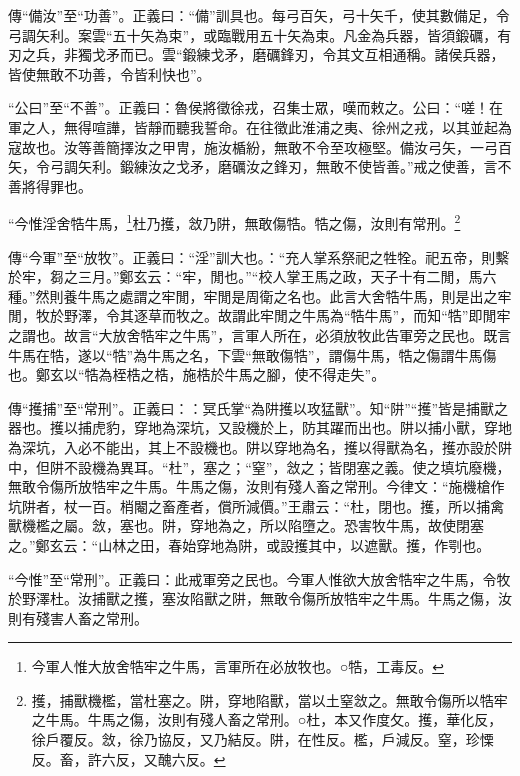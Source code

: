 {\noindent\zhuan{}\fzbyks 傳“備汝”至“功善”。正義曰：“備”訓具也。每弓百矢，弓十矢千，使其數備足，令弓調矢利。案雲“五十矢為束”，或臨戰用五十矢為束。凡金為兵器，皆須鍛礪，有刃之兵，非獨戈矛而已。雲“鍛練戈矛，磨礪鋒刃，令其文互相通稱。諸侯兵器，皆使無敢不功善，令皆利快也”。 \par}

{\noindent\shu{}\fzkt “公曰”至“不善”。正義曰：魯侯將徵徐戎，召集士眾，嘆而敕之。公曰：“嗟！在軍之人，無得喧譁，皆靜而聽我誓命。在往徵此淮浦之夷、徐州之戎，以其並起為寇故也。汝等善簡擇汝之甲冑，施汝楯紛，無敢不令至攻極堅。備汝弓矢，一弓百矢，令弓調矢利。鍛練汝之戈矛，磨礪汝之鋒刃，無敢不使皆善。”戒之使善，言不善將得罪也。 \par}

“今惟淫舍牿牛馬，\footnote{今軍人惟大放舍牿牢之牛馬，言軍所在必放牧也。○牿，工毒反。}杜乃擭，敜乃阱，無敢傷牿。牿之傷，汝則有常刑。\footnote{擭，捕獸機檻，當杜塞之。阱，穿地陷獸，當以土窒敜之。無敢令傷所以牿牢之牛馬。牛馬之傷，汝則有殘人畜之常刑。○杜，本又作度攵。擭，華化反，徐戶覆反。敜，徐乃協反，又乃結反。阱，在性反。檻，戶減反。窒，珍慄反。畜，許六反，又醜六反。}


{\noindent\zhuan{}\fzbyks 傳“今軍”至“放牧”。正義曰：“淫”訓大也。：“充人掌系祭祀之牲牷。祀五帝，則繫於牢，芻之三月。”鄭玄云：“牢，閒也。”“校人掌王馬之政，天子十有二閒，馬六種。”然則養牛馬之處謂之牢閒，牢閒是周衛之名也。此言大舍牿牛馬，則是出之牢閒，牧於野澤，令其逐草而牧之。故謂此牢閒之牛馬為“牿牛馬”，而知“牿”即閒牢之謂也。故言“大放舍牿牢之牛馬”，言軍人所在，必須放牧此告軍旁之民也。既言牛馬在牿，遂以“牿”為牛馬之名，下雲“無敢傷牿”，謂傷牛馬，牿之傷謂牛馬傷也。鄭玄以“牿為桎梏之梏，施梏於牛馬之腳，使不得走失”。 \par}

{\noindent\zhuan{}\fzbyks 傳“擭捕”至“常刑”。正義曰：：冥氏掌“為阱擭以攻猛獸”。知“阱”“擭”皆是捕獸之器也。擭以捕虎豹，穿地為深坑，又設機於上，防其躍而出也。阱以捕小獸，穿地為深坑，入必不能出，其上不設機也。阱以穿地為名，擭以得獸為名，擭亦設於阱中，但阱不設機為異耳。“杜”，塞之；“窒”，敜之；皆閉塞之義。使之填坑廢機，無敢令傷所放牿牢之牛馬。牛馬之傷，汝則有殘人畜之常刑。今律文：“施機槍作坑阱者，杖一百。梢閹之畜產者，償所減價。”王肅云：“杜，閉也。擭，所以捕禽獸機檻之屬。敜，塞也。阱，穿地為之，所以陷墮之。恐害牧牛馬，故使閉塞之。”鄭玄云：“山林之田，春始穿地為阱，或設擭其中，以遮獸。擭，作㓵也。 \par}

{\noindent\shu{}\fzkt “今惟”至“常刑”。正義曰：此戒軍旁之民也。今軍人惟欲大放舍牿牢之牛馬，令牧於野澤杜。汝捕獸之擭，塞汝陷獸之阱，無敢令傷所放牿牢之牛馬。牛馬之傷，汝則有殘害人畜之常刑。 \par}


